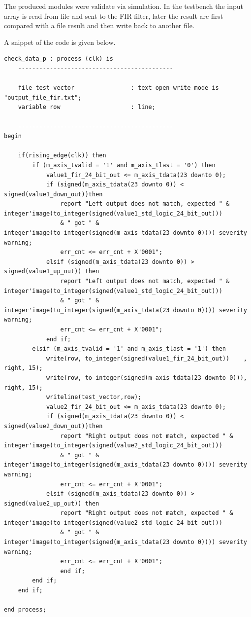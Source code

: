 \documentclass[11pt, a4paper]{article}
\begin{document}
The produced modules were validate via simulation. In the testbench the input array is read from file and sent to the FIR filter, later the result are first compared with a file result and then write back to another file.  

A snippet of the code is given below.

\begin{lstlisting}[style={VHDL-style}]
check_data_p : process (clk) is
    --------------------------------------------

    file test_vector                : text open write_mode is "output_file_fir.txt";
    variable row                    : line;
    
    --------------------------------------------
begin

    if(rising_edge(clk)) then
        if (m_axis_tvalid = '1' and m_axis_tlast = '0') then
            value1_fir_24_bit_out <= m_axis_tdata(23 downto 0);
            if (signed(m_axis_tdata(23 downto 0)) < signed(value1_down_out))then
                report "Left output does not match, expected " & integer'image(to_integer(signed(value1_std_logic_24_bit_out))) 
                & " got " & integer'image(to_integer(signed(m_axis_tdata(23 downto 0)))) severity warning;
                err_cnt <= err_cnt + X"0001";
            elsif (signed(m_axis_tdata(23 downto 0)) > signed(value1_up_out)) then
                report "Left output does not match, expected " & integer'image(to_integer(signed(value1_std_logic_24_bit_out))) 
                & " got " & integer'image(to_integer(signed(m_axis_tdata(23 downto 0)))) severity warning;
                err_cnt <= err_cnt + X"0001";
            end if;
        elsif (m_axis_tvalid = '1' and m_axis_tlast = '1') then
            write(row, to_integer(signed(value1_fir_24_bit_out))    , right, 15);
            write(row, to_integer(signed(m_axis_tdata(23 downto 0))), right, 15);
            writeline(test_vector,row);
            value2_fir_24_bit_out <= m_axis_tdata(23 downto 0);
            if (signed(m_axis_tdata(23 downto 0)) < signed(value2_down_out))then
                report "Right output does not match, expected " & integer'image(to_integer(signed(value2_std_logic_24_bit_out))) 
                & " got " & integer'image(to_integer(signed(m_axis_tdata(23 downto 0)))) severity warning;
                err_cnt <= err_cnt + X"0001";
            elsif (signed(m_axis_tdata(23 downto 0)) > signed(value2_up_out)) then
                report "Right output does not match, expected " & integer'image(to_integer(signed(value2_std_logic_24_bit_out))) 
                & " got " & integer'image(to_integer(signed(m_axis_tdata(23 downto 0)))) severity warning;
                err_cnt <= err_cnt + X"0001";
                end if;
        end if;
    end if;

end process;
\end{lstlisting}
\end{document}
